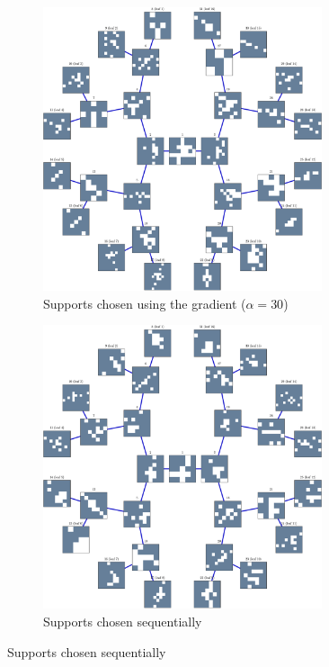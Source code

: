 \begin{figure}[!ht] \centering
\begin{subfigure}[b]{0.49\textwidth}\centering
\includegraphics[width=0.9\textwidth]{figures/tree-gradient-vs-sequential/xp_learnsupp256_curvelet_decomp3_tree-binary_dpth4_supp-diracs_usegrad1_every5_add5_totinit0_totadd279_alpha30_tree.pdf}
	\caption{Supports chosen using the gradient ($\alpha=30$)}\label{fig_cmpunbalanced-grad_tree}
\end{subfigure}
\begin{subfigure}[b]{0.49\textwidth}\centering
\includegraphics[width=0.9\textwidth]{figures/tree-gradient-vs-sequential/xp_learnsupp256_curvelet_decomp3_tree-binary_dpth4_supp-diracs_usegrad0_every5_add5_totinit0_totadd279_alpha30_tree.pdf} 
	\caption{Supports chosen sequentially}\label{fig_cmpunbalanced-seq_tree}
\end{subfigure}
\end{figure}
